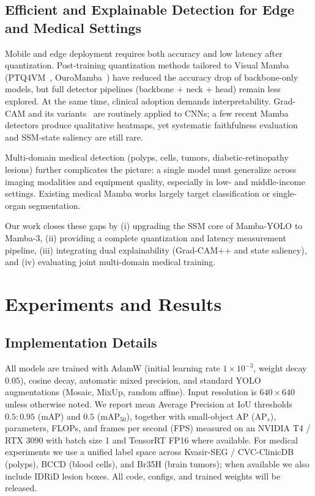 \subsection{Efficient and Explainable Detection for Edge and Medical Settings}
Mobile and edge deployment requires both accuracy and low latency after quantization. Post-training quantization methods tailored to Visual Mamba (PTQ4VM~\cite{cho2025ptq4vm}, OuroMamba~\cite{ramachandran2025ouromamba}) have reduced the accuracy drop of backbone-only models, but full detector pipelines (backbone + neck + head) remain less explored. At the same time, clinical adoption demands interpretability. Grad-CAM and its variants~\cite{chattopadhay2018gradcam++} are routinely applied to CNNs; a few recent Mamba detectors produce qualitative heatmaps, yet systematic faithfulness evaluation and SSM-state saliency are still rare.

Multi-domain medical detection (polyps, cells, tumors, diabetic-retinopathy lesions) further complicates the picture: a single model must generalize across imaging modalities and equipment quality, especially in low- and middle-income settings. Existing medical Mamba works largely target classification or single-organ segmentation.

Our work closes these gaps by (i) upgrading the SSM core of Mamba-YOLO to Mamba-3, (ii) providing a complete quantization and latency measurement pipeline, (iii) integrating dual explainability (Grad-CAM++ and state saliency), and (iv) evaluating joint multi-domain medical training.

\section{Experiments and Results}
\label{sec:experiments}

\subsection{Implementation Details}
All models are trained with AdamW (initial learning rate $1\times10^{-3}$, weight decay $0.05$), cosine decay, automatic mixed precision, and standard YOLO augmentations (Mosaic, MixUp, random affine). Input resolution is $640\times640$ unless otherwise noted. We report mean Average Precision at IoU thresholds $0.5:0.95$ (mAP) and $0.5$ (mAP$_{50}$), together with small-object AP (AP$_s$), parameters, FLOPs, and frames per second (FPS) measured on an NVIDIA T4 / RTX 3090 with batch size 1 and TensorRT FP16 where available. For medical experiments we use a unified label space across Kvasir-SEG / CVC-ClinicDB (polyps), BCCD (blood cells), and Br35H (brain tumors); when available we also include IDRiD lesion boxes. All code, configs, and trained weights will be released.

